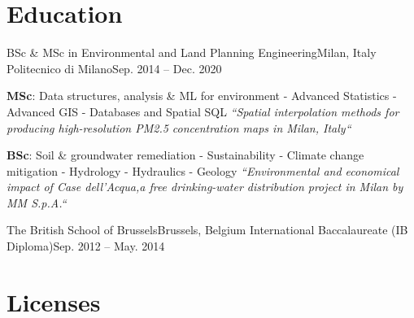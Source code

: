 \documentclass[letterpaper,11pt]{article}
\begin{document}


\section{Education}
\begin{sectionElementsList}
  \experienceElement
  {BSc \& MSc in Environmental and Land Planning Engineering}{Milan, Italy}
  {Politecnico di Milano}{Sep. 2014 -- Dec. 2020}
  {
    \scriptsize
    \textbf{MSc}: Data structures, analysis \& ML for environment - Advanced Statistics - Advanced GIS - Databases and Spatial SQL
    \newline
    \textit{“Spatial interpolation methods for producing high-resolution PM2.5
      concentration maps in Milan, Italy“}

    \textbf{BSc}:  Soil \& groundwater remediation - Sustainability - Climate change mitigation - Hydrology - Hydraulics - Geology
    \newline
    \textit{“Environmental and economical impact of Case dell'Acqua,a
      free drinking-water distribution project in Milan by MM S.p.A.“}
  }{}

  \experienceElement
  {The British School of Brussels}{Brussels, Belgium}
  {International Baccalaureate (IB Diploma)}{Sep. 2012 -- May. 2014}
  {}{}
\end{sectionElementsList}

\section{Licenses}
\begin{sectionElementsList}
\end{sectionElementsList}

\end{document}
